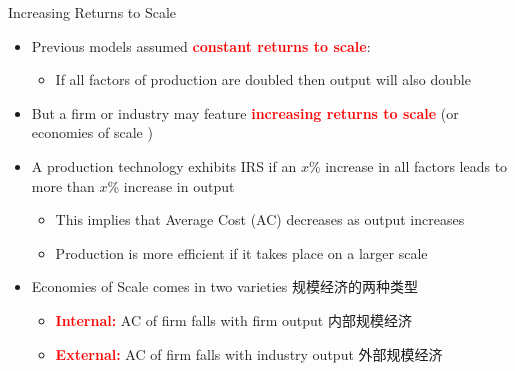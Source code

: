 \documentclass[10pt,hyperref={CJKbookmarks=true},xcolor=dvipsnames,aspectratio=169]{beamer}
\begin{document}
\begin{frame}{Increasing Returns to Scale }

\begin{itemize}
\item Previous models assumed \textbf{\textcolor{red}{constant returns to
scale}}: 

\begin{itemize}
\item If all factors of production are doubled then output will also double 
\end{itemize}
\item But a firm or industry may feature \textbf{\textcolor{red}{increasing
returns to scale}} (or economies of scale ) 
\item A production technology exhibits IRS if an $x$\% increase in all
factors leads to more than $x$\% increase in output 

\begin{itemize}
\item This implies that Average Cost (AC) decreases as output increases 
\item Production is more efficient if it takes place on a larger scale 
\end{itemize}
\item Economies of Scale comes in two varieties 规模经济的两种类型

\begin{itemize}
\item \textbf{\textcolor{red}{Internal:}} AC of firm falls with firm output
内部规模经济
\item \textbf{\textcolor{red}{External:}} AC of firm falls with industry
output 外部规模经济
\end{itemize}
\end{itemize}
\end{frame}
\end{document}
